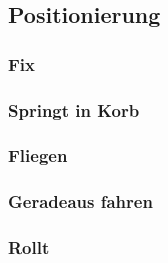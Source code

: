 \subsection{Positionierung}

\subsubsection{Fix}

\subsubsection{Springt in Korb}

\subsubsection{Fliegen}

\subsubsection{Geradeaus fahren}

\subsubsection{Rollt}
